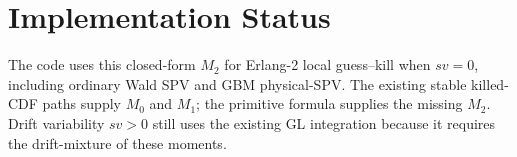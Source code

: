 \documentclass[11pt]{article}
\begin{document}
\section{Implementation Status}

The code uses this closed-form $M_2$ for Erlang-2 local guess--kill when $sv=0$, including ordinary Wald SPV and GBM physical-SPV. The existing stable killed-CDF paths supply $M_0$ and $M_1$; the primitive formula supplies the missing $M_2$. Drift variability $sv>0$ still uses the existing GL integration because it requires the drift-mixture of these moments.
\end{document}
